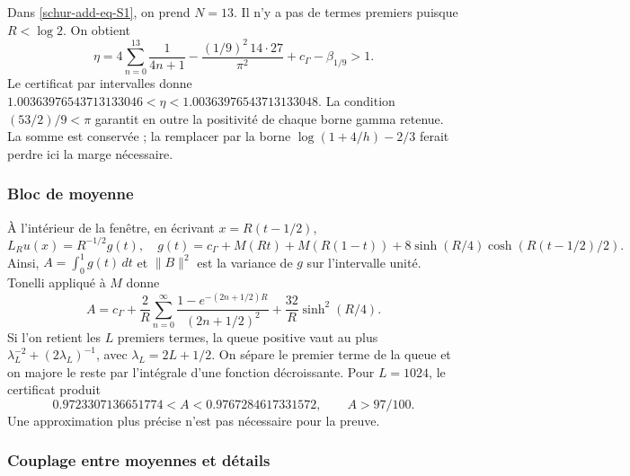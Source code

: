 Dans \eqref{schur-add-eq-S1}, on prend \(N=13\). Il n'y a pas de termes premiers puisque \(R<\log2\). On obtient
\begin{equation}
\eta=4\sum_{n=0}^{13}\frac1{4n+1}
-\frac{(1/9)^2\,14\cdot27}{\pi^2}+c_\Gamma-\beta_{1/9}>1.
\label{schur-add-eq-S9}
\end{equation}
Le certificat par intervalles donne
\(1.00363976543713133046<\eta<1.00363976543713133048\).
La condition \((53/2)/9<\pi\) garantit en outre la positivité de
chaque borne gamma retenue. La somme est conservée ; la remplacer par la
borne \(\log(1+4/h)-2/3\) ferait perdre ici la marge nécessaire.

\subsubsection{Bloc de moyenne}
\label{schur-add-sub-269}

À l'intérieur de la fenêtre, en écrivant \(x=R(t-1/2)\),
\begin{equation}
L_Ru(x)=R^{-1/2}g(t),\quad
g(t)=c_\Gamma+M(Rt)+M(R(1-t))
+8\sinh(R/4)\cosh(R(t-1/2)/2).
\label{schur-add-display-22}
\end{equation}
Ainsi, \(A=\int_0^1g(t)\,dt\) et \(\|B\|^2\) est la variance
de \(g\) sur l'intervalle unité. Tonelli appliqué à \(M\) donne
\begin{equation}
A=c_\Gamma+\frac2R\sum_{n=0}^\infty
\frac{1-e^{-(2n+1/2)R}}{(2n+1/2)^2}
+\frac{32}R\sinh^2(R/4).
\label{schur-add-eq-S10}
\end{equation}
Si l'on retient les \(L\) premiers termes, la queue positive vaut au plus \(\lambda_L^{-2}+(2\lambda_L)^{-1}\), avec \(\lambda_L=2L+1/2\). On sépare le premier terme de la queue et on majore le reste par l'intégrale d'une fonction décroissante. Pour \(L=1024\), le certificat produit
\begin{equation}
0.9723307136651774<A<0.9767284617331572,
\qquad A>97/100.
\label{schur-add-eq-S11}
\end{equation}
Une approximation plus précise n'est pas nécessaire pour la preuve.

\subsubsection{Couplage entre moyennes et détails}
\label{schur-add-sub-295}

